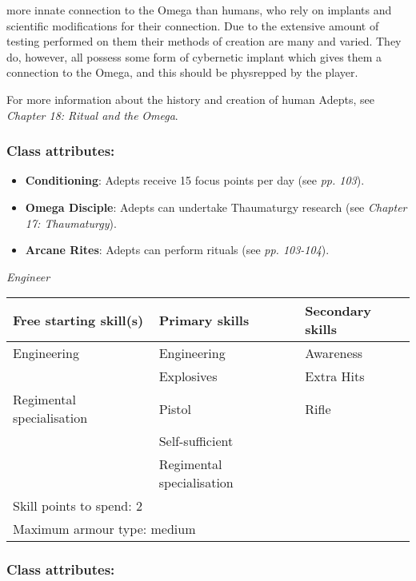 more innate connection to the Omega than humans, who rely on implants and scientific modifications for their connection. Due to the extensive amount of testing performed on them their methods of creation are many and varied. They do, however, all possess some form of cybernetic implant which gives them a connection to the Omega, and this should be physrepped by the player.

For more information about the history and creation of human Adepts, see \textit{Chapter 18: Ritual and the} \textit{Omega}.

\subsubsection{Class attributes:}

\begin{itemize}
\item \textbf{Conditioning}: Adepts receive 15 focus points per day (see \textit{pp. 103}).

\item \textbf{Omega Disciple}: Adepts can undertake Thaumaturgy research (see \textit{Chapter 17: Thaumaturgy}).

\item \textbf{Arcane Rites}: Adepts can perform rituals (see \textit{pp. 103-104}).

\end{itemize}
\textit{Engineer}

\begin{table}[H]
\begin{tabular}{|l|l|l|} \hline 
Free starting skill(s) & Primary skills & Secondary skills \\
 \hline Engineering & Engineering & Awareness \\
 \hline  & Explosives & Extra Hits \\
 \hline Regimental specialisation & Pistol & Rifle \\
 \hline  & Self-sufficient &  \\
 \hline  & Regimental specialisation &  \\
 \hline \multicolumn{3}{|l|}{Skill points to spend: 2} \\
 \hline \multicolumn{3}{|l|}{Maximum armour type: medium} \\
 \hline \end{tabular}

\end{table}

\subsubsection{Class attributes:}

